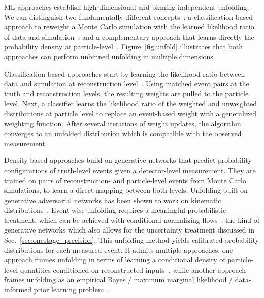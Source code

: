 \documentclass[submission,Phys]{SciPost}
\begin{document}
ML-approaches establish high-dimensional and binning-independent unfolding. We can distinguish two fundamentally different concepts~\cite{Arratia:2021otl}: a classification-based approach to reweight a Monte Carlo simulation with the learned likelihood ratio of data and simulation~\cite{Andreassen:2019cjw}; and a complementary approach that learns directly the probability density at particle-level~\cite{Bellagente:2020piv}.  Figure~\ref{fig:unfold} illustrates that both approaches can perform unbinned unfolding in multiple dimensions.

Classification-based approaches start by learning the likelihood ratio between data and simulation at reconstruction level~\cite{Andreassen:2019cjw, Andreassen:2021zzk, Komiske:2021vym}. Using matched event pairs at the truth and reconstruction levels, the resulting weights are pulled to the particle level. Next, a classifier learns the likelihood ratio of the weighted and unweighted distributions at particle level to replace an event-based weight with a generalized weighting function. After several iterations of weight updates, the algorithm converges to an unfolded distribution which is compatible with the observed measurement.
    
Density-based approaches build on generative networks that predict probability configurations of truth-level events given a detector-level measurement. They are trained on pairs of reconstruction- and particle-level events from Monte Carlo simulations, to learn a direct mapping between both levels. Unfolding built on generative adversarial networks has been shown to work on kinematic distributions~\cite{Datta:2018mwd, Bellagente:2019uyp}. Event-wise unfolding requires a meaningful probabilistic treatment, which can be achieved with conditional normalizing flows~\cite{Bellagente:2020piv,Vandegar:2020yvw}, the kind of generative networks which also allows for the uncertainty treatment discussed in Sec.~\ref{sec:onestage_precision}. This unfolding method yields calibrated probability distributions for each measured event. It admits multiple approaches; one approach frames unfolding in terms of learning a conditional density of particle-level quantities conditioned on reconstructed inputs~\cite{Bellagente:2020piv}, while another approach frames unfolding as an empirical Bayes / maximum marginal likelihood / data-informed prior learning problem~\cite{Vandegar:2020yvw}.
\end{document}
